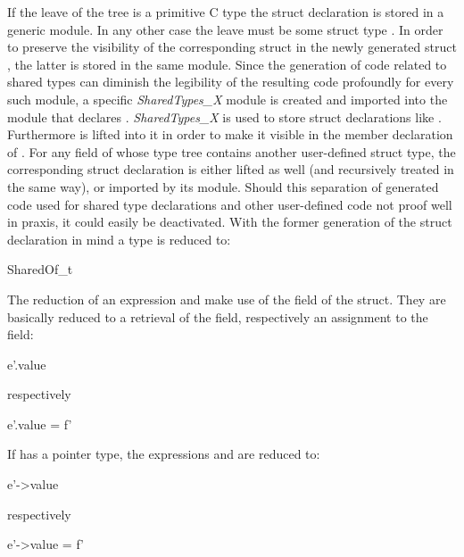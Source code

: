 \vspace{0.5cm}
If the leave of the tree is a primitive C type the struct declaration is stored in a generic module. In any other case the leave must be some struct type . In order to preserve the visibility of the corresponding struct in the newly generated struct , the latter is stored in the same module. Since the generation of code related to shared types can diminish the legibility of the resulting code profoundly for every such module, a specific \textit{SharedTypes\_X} module is created and imported into the module that declares . \textit{SharedTypes\_X} is used to store struct declarations like . Furthermore  is lifted into it in order to make it visible in the member declaration  of . For any field of  whose type tree contains another user-defined struct type, the corresponding struct declaration is either lifted as well (and recursively treated in the same way), or imported by its module. Should this separation of generated code used for shared type declarations and other user-defined code not proof well in praxis, it could easily be deactivated.
With the former generation of the struct declaration in mind a type  is reduced to:
\begin{ccode}
SharedOf_t
\end{ccode}
The reduction of an expression  and  make use of the  field of the  struct. They are basically reduced to a retrieval of the field, respectively an assignment to the field:

\begin{minipage}{0.15\textwidth}
\begin{ccode}
e'.value
\end{ccode}
\end{minipage}
\begin{minipage}{0.2\textwidth}
respectively
\end{minipage}
\begin{minipage}{0.3\textwidth}
\begin{ccode}
e'.value = f'
\end{ccode}
\end{minipage}

If  has a pointer type, the expressions  and  are reduced to:

\begin{minipage}{0.15\textwidth}
\begin{ccode}
e'->value
\end{ccode}
\end{minipage}
\begin{minipage}{0.2\textwidth}
respectively
\end{minipage}
\begin{minipage}{0.3\textwidth}
\begin{ccode}
e'->value = f'
\end{ccode}
\end{minipage}

